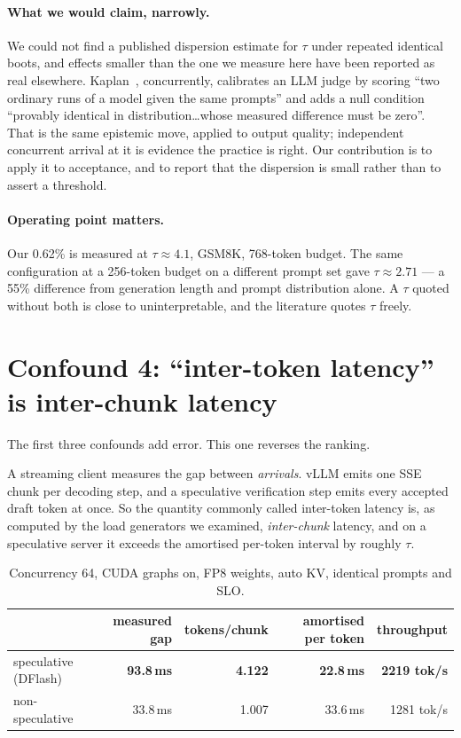 \documentclass[11pt]{article}
\begin{document}
\paragraph{What we would claim, narrowly.} We could not find a published
dispersion estimate for $\tau$ under repeated identical boots, and effects
smaller than the one we measure here have been reported as real elsewhere.
Kaplan~\cite{kaplan2026calibrated}, concurrently, calibrates an LLM judge by
scoring ``two ordinary runs of a model given the same prompts'' and adds a
null condition ``provably identical in distribution\ldots whose measured
difference must be zero''. That is the same epistemic move, applied to
output quality; independent concurrent arrival at it is evidence the
practice is right. Our contribution is to apply it to acceptance, and to
report that the dispersion is small rather than to assert a threshold.

\paragraph{Operating point matters.} Our 0.62\% is measured at
$\tau \approx 4.1$, GSM8K, 768-token budget. The same configuration at a
256-token budget on a different prompt set gave $\tau \approx 2.71$ --- a
55\% difference from generation length and prompt distribution alone. A
$\tau$ quoted without both is close to uninterpretable, and the literature
quotes $\tau$ freely.

\section{Confound 4: ``inter-token latency'' is inter-chunk latency}\label{sec:c4}

The first three confounds add error. This one reverses the ranking.

A streaming client measures the gap between \emph{arrivals}. vLLM emits one
SSE chunk per decoding step, and a speculative verification step emits every
accepted draft token at once. So the quantity commonly called inter-token
latency is, as computed by the load generators we examined, \emph{inter-chunk}
latency, and on a speculative server it exceeds the amortised per-token
interval by roughly $\tau$.

\begin{table}[h]\centering\small
\caption{Concurrency 64, CUDA graphs on, FP8 weights, auto KV, identical
prompts and SLO.}
\begin{tabular}{lrrrr}
\toprule
& measured gap & tokens/chunk & amortised per token & throughput\\
\midrule
speculative (DFlash) & \textbf{93.8\,ms} & \textbf{4.122} & \textbf{22.8\,ms} & \textbf{2219 tok/s}\\
non-speculative & 33.8\,ms & 1.007 & 33.6\,ms & 1281 tok/s\\
\bottomrule
\end{tabular}
\end{table}
\end{document}

